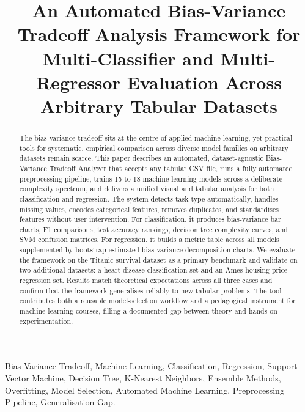 \documentclass[conference]{IEEEtran}
\begin{document}
\title{An Automated Bias-Variance Tradeoff Analysis Framework for
Multi-Classifier and Multi-Regressor Evaluation Across Arbitrary Tabular Datasets}

\author{
}

\maketitle
\IEEEpubidadjcol
\pagestyle{plain}

\begin{abstract}
The bias-variance tradeoff sits at the centre of applied machine learning, yet practical tools for systematic, empirical comparison across diverse model families on arbitrary datasets remain scarce. This paper describes an automated, dataset-agnostic Bias-Variance Tradeoff Analyzer that accepts any tabular CSV file, runs a fully automated preprocessing pipeline, trains 15 to 18 machine learning models across a deliberate complexity spectrum, and delivers a unified visual and tabular analysis for both classification and regression. The system detects task type automatically, handles missing values, encodes categorical features, removes duplicates, and standardises features without user intervention. For classification, it produces bias-variance bar charts, F1 comparisons, test accuracy rankings, decision tree complexity curves, and SVM confusion matrices. For regression, it builds a metric table across all models supplemented by bootstrap-estimated bias-variance decomposition charts. We evaluate the framework on the Titanic survival dataset as a primary benchmark and validate on two additional datasets: a heart disease classification set and an Ames housing price regression set. Results match theoretical expectations across all three cases and confirm that the framework generalises reliably to new tabular problems. The tool contributes both a reusable model-selection workflow and a pedagogical instrument for machine learning courses, filling a documented gap between theory and hands-on experimentation.
\end{abstract}

\begin{IEEEkeywords}
Bias-Variance Tradeoff, Machine Learning, Classification, Regression, Support Vector Machine, Decision Tree, K-Nearest Neighbors, Ensemble Methods, Overfitting, Model Selection, Automated Machine Learning, Preprocessing Pipeline, Generalisation Gap.
\end{IEEEkeywords}
\end{document}
